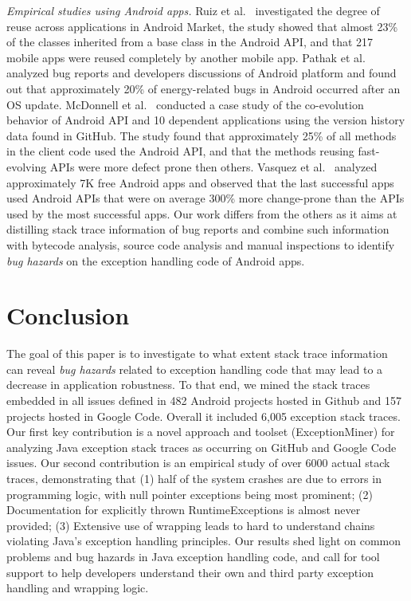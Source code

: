 \textit{Empirical studies using Android apps.} Ruiz et al.~\cite{Ruiz12}
investigated the degree of reuse across applications in Android Market, the
study showed that almost 23\% of the classes inherited from a base class in the
Android API, and that 217 mobile apps were reused completely by another mobile
app. Pathak et al.~\cite{Patha11} analyzed bug reports and developers
discussions of Android platform and found out that approximately 20\% of
energy-related bugs in Android occurred after an OS update. McDonnell et
al.~\cite{McDon13} conducted a case study of the co-evolution behavior of
Android API and 10 dependent applications using the version history data found
in GitHub. The study found that approximately 25\% of all methods in the client
code used the Android API, and that the methods reusing fast-evolving APIs were
more defect prone then others. Vasquez et al.~\cite{Linar13} analyzed
approximately 7K free Android apps and observed that the last successful apps
used Android APIs that were on average 300\% more change-prone than the APIs
used by the most successful apps. Our work differs from the others as it aims at
distilling stack trace information of bug reports and combine such information
with bytecode analysis, source code analysis and manual inspections
to identify \emph{bug hazards} on the exception handling code of Android apps.



\section{Conclusion}
\label{sec:conc}

The goal of this paper is to investigate 
to what extent stack trace information can reveal \emph{bug hazards} 
related to exception handling code that may lead to a decrease in
application robustness. 
To that end, we mined the stack 
traces embedded in all issues defined in 482 Android projects hosted in Github and 
157 projects hosted in Google Code. Overall it included 6,005
exception stack traces. Our first key contribution is
a novel approach and toolset (ExceptionMiner) for analyzing Java
  exception stack traces as occurring on GitHub and Google Code
  issues.
Our second contribution is
an empirical study of over 6000 actual stack traces,
  demonstrating that (1) half of the system crashes are due to errors
  in programming logic, with null pointer exceptions being most
  prominent;
  (2) Documentation for explicitly thrown RuntimeExceptions is almost
  never provided; 
  (3) Extensive use of wrapping leads to hard to understand chains
  violating Java's exception handling principles.
Our results shed light on common problems and bug hazards in Java
exception handling code, and call for tool support to help developers
understand their own and third party exception handling and wrapping logic.

